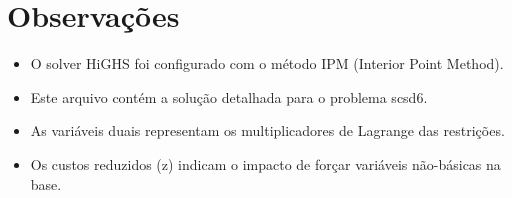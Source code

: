 \documentclass[12pt]{article}
\begin{document}
\begin{longtable}{@{}cc@{}}
\end{longtable}


\section{Observações}

\begin{itemize}
\item O solver HiGHS foi configurado com o método IPM (Interior Point Method).
\item Este arquivo contém a solução detalhada para o problema scsd6.
\item As variáveis duais representam os multiplicadores de Lagrange das restrições.
\item Os custos reduzidos (z) indicam o impacto de forçar variáveis não-básicas na base.
\end{itemize}
\end{document}
